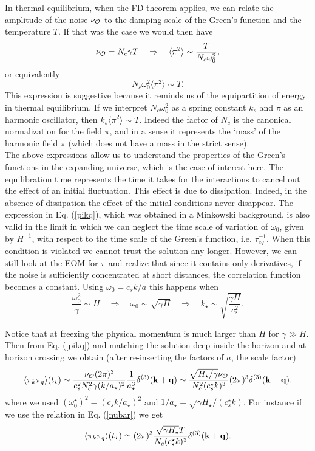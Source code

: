 \documentclass[11pt,amsmath,floats,floatfix,nofootinbib,secnumarabic, superscriptaddress, tightenlines]{revtex4}
\newcommand{\beq}{\begin{equation}}
\newcommand{\eeq}{\end{equation}}
\newcommand{\calo}{{\cal O}}
\begin{document}
In thermal equilibrium, when the FD theorem applies, we can relate the amplitude of the noise $\nu_{\cal O}$ to the damping scale of the Green's function and the temperature $T$. If that was the case we would then have
\beq
\label{nubar}
\nu_{\calo} = N_c \gamma  T \quad\Rightarrow\quad \langle \pi^2 \rangle \sim \frac{ T}{N_c\omega_0^2},
\eeq
or equivalently
\beq
N_c \omega_0^2 \langle \pi^2 \rangle \sim  T.
\eeq
This expression is suggestive because it reminds us of the equipartition of energy in thermal equilibrium. If we interpret $N_c\omega_0^2$ as a spring constant $k_s$ and $\pi$ as an harmonic oscillator, then $k_s\langle\pi^2\rangle \sim  T$. Indeed the factor of $N_c$ is the canonical normalization for the field $\pi$, and in a sense it represents the `mass' of the harmonic field $\pi$ (which does not have a mass in the strict sense).\\

The above expressions allow us to understand the properties of the Green's functions in the expanding universe, which is the case of interest here. The equilibration time represents the time it takes for the interactions to cancel out the effect of an initial fluctuation. This effect is due to dissipation. Indeed, in the absence of dissipation the effect of the initial conditions never disappear. The expression in Eq. (\ref{pikq}), which was obtained in a Minkowski background, is also valid in the limit in which we can neglect the time scale of variation of $\omega_0$, given by $H^{-1}$, with respect to the time scale of the Green's function, i.e. $\tau_{eq}^{-1}$. When this condition is violated we cannot trust the solution any longer. However, we can still look at the EOM for $\pi$ and realize that since it contains only derivatives, if the noise is sufficiently concentrated at short distances, the correlation function becomes a constant.
Using $\omega_0=c_s k/a$ this happens when
\beq
\frac{\omega_0^2}{\gamma}\sim H\quad\Rightarrow\quad \omega_0\sim\sqrt{\gamma H}\quad\Rightarrow \quad k_\star \sim \sqrt{\frac{\gamma H}{c_s^2}}.
\eeq

Notice that at freezing the physical momentum is much larger than $H$ for $\gamma\gg H$. Then from Eq. (\ref{pikq}) and matching the solution deep inside the horizon and at horizon crossing we obtain (after re-inserting the factors of $a$, the scale factor)
\beq
\label{tpnuo}
\langle \pi_k \pi_q \rangle (t_\star) \sim \frac{ \nu_{\calo}(2\pi)^3}{c_s^2N^2_c \gamma (k/a_\star)^2}\frac{1}{a_\star^3}\delta^{(3)}({\bf k}+{\bf q}) \sim \frac{\sqrt{H_\star/\gamma}  \nu_{\calo}}{N^2_c (c^\star_sk)^3} (2\pi)^3\delta^{(3)}({\bf k}+{\bf q}),
\eeq
where we used $(\omega^\star_0)^2= (c_sk/a_\star)^2$ and $1/a_\star = \sqrt{\gamma H_\star}/(c^\star_s k)$. For instance if we use the relation in Eq. (\ref{nubar}) we get 
\beq
\label{tpwarm}
\langle \pi_k \pi_q \rangle (t_\star)  \simeq (2\pi)^3\frac{\sqrt{\gamma H_\star}  T}{N_c (c^\star_sk)^3} \delta^{(3)}({\bf k}+{\bf q}).
\eeq 
\end{document}
